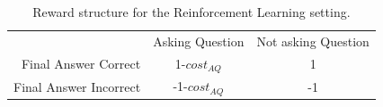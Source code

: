 \begin{table}[!ht]
\small
\begin{tabular}{rcc}
&Asking Question &Not asking Question \\
Final Answer Correct & 1-$cost_{AQ}$ & 1\\
Final Answer Incorrect & -1-$cost_{AQ}$ & -1\\
\end{tabular}
\caption{Reward structure for the Reinforcement Learning setting.}
\label{reward}
\end{table}

